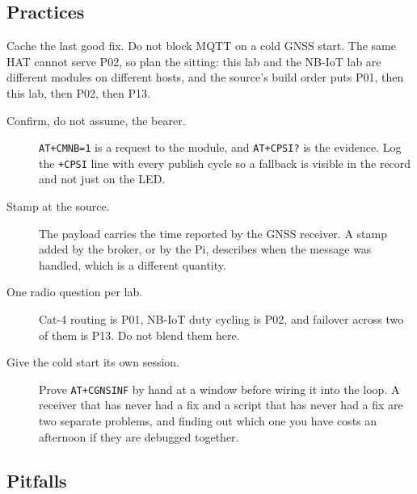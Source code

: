 \subsection*{Practices}

Cache the last good fix. Do not block MQTT on a cold GNSS start. The same HAT cannot serve P02, so plan the sitting: this lab and the NB-IoT lab are different modules on different hosts, and the source's build order puts P01, then this lab, then P02, then P13.

\begin{description}
\item[Confirm, do not assume, the bearer.] \texttt{AT+CMNB=1} is a request to the module, and \texttt{AT+CPSI?} is the evidence. Log the \texttt{+CPSI} line with every publish cycle so a fallback is visible in the record and not just on the LED.
\item[Stamp at the source.] The payload carries the time reported by the GNSS receiver. A stamp added by the broker, or by the Pi, describes when the message was handled, which is a different quantity.
\item[One radio question per lab.] Cat-4 routing is P01, NB-IoT duty cycling is P02, and failover across two of them is P13. Do not blend them here.
\item[Give the cold start its own session.] Prove \texttt{AT+CGNSINF} by hand at a window before wiring it into the loop. A receiver that has never had a fix and a script that has never had a fix are two separate problems, and finding out which one you have costs an afternoon if they are debugged together.
\end{description}

\subsection*{Pitfalls}

